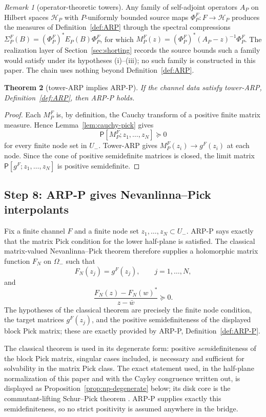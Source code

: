 \documentclass[11pt]{amsart}
\newtheorem{theorem}{Theorem}[section]
\theoremstyle{definition}
\theoremstyle{remark}
\newtheorem{remark}[theorem]{Remark}
\theoremstyle{definition}
\newcommand{\cH}{\mathcal{H}}
\begin{document}
\begin{remark}[operator-theoretic towers]\label{rmk:operator-towers}
Any family of self-adjoint operators $A_P$ on Hilbert spaces $\cH_P$ with $P$-uniformly bounded source
maps $\Phi_P^F:F\to\cH_P$ produces the measures of Definition~\ref{def:ARP} through the spectral
compressions $\Sigma_P^F(B)=(\Phi_P^F)^*E_P(B)\Phi_P^F$, for which
$M_P^F(z)=(\Phi_P^F)^*(A_P-z)^{-1}\Phi_P^F$.  The realization layer of Section~\ref{sec:shorting}
records the source bounds such a family would satisfy under its hypotheses (i)--(iii); no such family is
constructed in this paper.
The chain uses nothing beyond Definition~\ref{def:ARP}.
\end{remark}

\begin{theorem}[tower-ARP implies ARP-P]\label{thm:tower-implies-pick}
If the channel data satisfy tower-ARP, Definition~\ref{def:ARP}, then ARP-P holds.
\end{theorem}

\begin{proof}
Each $M_P^F$ is, by definition, the Cauchy transform of a positive finite matrix measure.  Hence
Lemma~\ref{lem:cauchy-pick} gives
\[
   \mathsf P[M_P^F;z_1,\ldots,z_N]\succeq0
\]
for every finite node set in $U_-$.  Tower-ARP gives $M_P^F(z_i)\to g^F(z_i)$ at each node.  Since the
cone of positive semidefinite matrices is closed, the limit matrix
$\mathsf P[g^F;z_1,\ldots,z_N]$ is positive semidefinite.
\end{proof}

\subsection{Step 8: ARP-P gives Nevanlinna--Pick interpolants}

Fix a finite channel $F$ and a finite node set $z_1,\ldots,z_N\subset U_-$.  ARP-P says exactly that the
matrix Pick condition for the lower half-plane is satisfied.  The classical matrix-valued
Nevanlinna--Pick theorem therefore supplies a holomorphic matrix function $F_N$ on $\Omega_-$ such that
\[
   F_N(z_j)=g^F(z_j),\qquad j=1,\ldots,N,
\]
and
\[
   \frac{F_N(z)-F_N(w)^*}{z-\bar w}\succeq0.
\]
The hypotheses of the classical theorem are precisely the finite node condition, the target matrices
$g^F(z_j)$, and the positive semidefiniteness of the displayed block Pick matrix; these are exactly
provided by ARP-P, Definition~\ref{def:ARP-P}.

The classical theorem is used in its degenerate form: positive \emph{semi}definiteness of the block
Pick matrix, singular cases included, is necessary and sufficient for solvability in the matrix Pick
class.  The exact statement used, in the half-plane normalization of this paper and with the Cayley
congruence written out, is displayed as Proposition~\ref{prop:np-degenerate} below; its disk core is the
commutant-lifting Schur--Pick theorem \cite{FoiasFrazho}.  ARP-P supplies
exactly this semidefiniteness, so no strict positivity is assumed anywhere in the bridge.
\end{document}
